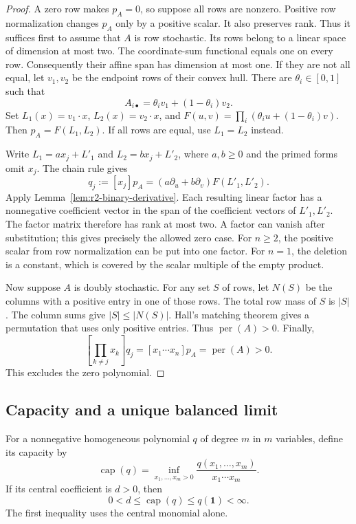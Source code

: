 \documentclass[11pt,a4paper]{article}
\theoremstyle{definition}
\theoremstyle{remark}
\newcommand{\per}{\operatorname{per}}
\begin{document}
\begin{proof}
A zero row makes $p_A=0$, so suppose all rows are nonzero.
Positive row normalization changes $p_A$ only by a positive scalar.
It also preserves rank.
Thus it suffices first to assume that $A$ is row stochastic.
Its rows belong to a linear space of dimension at most two.
The coordinate-sum functional equals one on every row.
Consequently their affine span has dimension at most one.
If they are not all equal, let $v_1,v_2$ be the endpoint rows of their convex hull.
There are $\theta_i\in[0,1]$ such that
\[
 A_{i\bullet}=\theta_i v_1+(1-\theta_i)v_2.
\]
Set $L_1(x)=v_1\cdot x$, $L_2(x)=v_2\cdot x$, and
$F(u,v)=\prod_i(\theta_i u+(1-\theta_i)v)$.
Then $p_A=F(L_1,L_2)$.
If all rows are equal, use $L_1=L_2$ instead.

Write $L_1=ax_j+L'_1$ and $L_2=bx_j+L'_2$, where $a,b\ge0$ and the primed forms omit $x_j$.
The chain rule gives
\begin{equation}\label{eq:r2-singleton-extraction}
 q_j:=[x_j]p_A=(a\partial_u+b\partial_v)F(L'_1,L'_2).
\end{equation}
Apply Lemma~\ref{lem:r2-binary-derivative}.
Each resulting linear factor has a nonnegative coefficient vector in the span of the coefficient vectors of $L'_1,L'_2$.
The factor matrix therefore has rank at most two.
A factor can vanish after substitution; this gives precisely the allowed zero case.
For $n\ge2$, the positive scalar from row normalization can be put into one factor.
For $n=1$, the deletion is a constant, which is covered by the scalar multiple of the empty product.

Now suppose $A$ is doubly stochastic.
For any set $S$ of rows, let $N(S)$ be the columns with a positive entry in one of those rows.
The total row mass of $S$ is $|S|$.
The column sums give $|S|\le|N(S)|$.
Hall's matching theorem gives a permutation that uses only positive entries.
Thus $\per(A)>0$.
Finally,
\begin{equation}\label{eq:r2-central-preservation}
 \left[\prod_{k\ne j}x_k\right]q_j
 =[x_1\cdots x_n]p_A=\per(A)>0.
\end{equation}
This excludes the zero polynomial.
\end{proof}

\subsection{Capacity and a unique balanced limit}

For a nonnegative homogeneous polynomial $q$ of degree $m$ in $m$ variables, define its capacity by
\[
 \operatorname{cap}(q)=\inf_{x_1,\ldots,x_m>0}
 \frac{q(x_1,\ldots,x_m)}{x_1\cdots x_m}.
\]
If its central coefficient is $d>0$, then
\begin{equation}\label{eq:r2-capacity-bounds}
 0<d\le\operatorname{cap}(q)\le q(\mathbf1)<\infty.
\end{equation}
The first inequality uses the central monomial alone.
\end{document}
